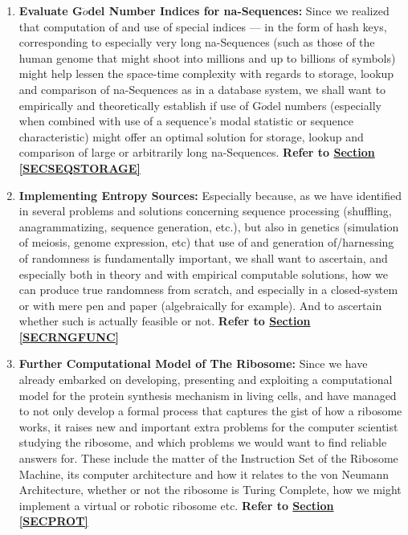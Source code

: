 \documentclass[a4paper, 18pt]{book} %
\begin{document}
\begin{enumerate}
\item \textbf{Evaluate G$\ddot{o}$del Number Indices for na-Sequences:} Since we realized that computation of and use of special indices --- in the form of hash keys, corresponding to especially very long na-Sequences (such as those of the human genome that might shoot into millions and up to billions of symbols) might help lessen the space-time complexity with regards to storage, lookup and comparison of na-Sequences as in a database system, we shall want to empirically and theoretically establish if use of G$\ddot{o}$del numbers (especially when combined with use of a sequence's modal statistic or sequence characteristic) might offer an optimal solution for storage, lookup and comparison of large or arbitrarily long na-Sequences. \textbf{Refer to \textbf{\hyperref[SECSEQSTORAGE]{Section \ref{SECSEQSTORAGE}}}}

\item \textbf{Implementing Entropy Sources:} Especially because, as we have identified in several problems and solutions concerning sequence processing (shuffling, anagrammatizing, sequence generation, etc.), but also in genetics (simulation of meiosis, genome expression, etc) that use of and generation of/harnessing of randomness is fundamentally important, we shall want to ascertain, and especially both in theory and with empirical computable solutions, how we can produce true randomness from scratch, and especially in a closed-system or with mere pen and paper (algebraically for example). And to ascertain whether such is actually feasible or not. \textbf{Refer to \textbf{\hyperref[SECRNGFUNC]{Section \ref{SECRNGFUNC}}}} 

\item \textbf{Further Computational Model of The Ribosome:} Since we have already embarked on developing, presenting and exploiting a computational model for the protein synthesis mechanism in living cells, and have managed to not only develop a formal process that captures the gist of how a ribosome works, it raises new and important extra problems for the computer scientist studying the ribosome, and which problems we would want to find reliable answers for. These include the matter of the Instruction Set of the Ribosome Machine, its computer architecture and how it relates to the von Neumann Architecture, whether or not the ribosome is Turing Complete, how we might implement a virtual or robotic ribosome etc. \textbf{Refer to \textbf{\hyperref[SECPROT]{Section \ref{SECPROT}}}} 


\end{enumerate}
\end{document}
